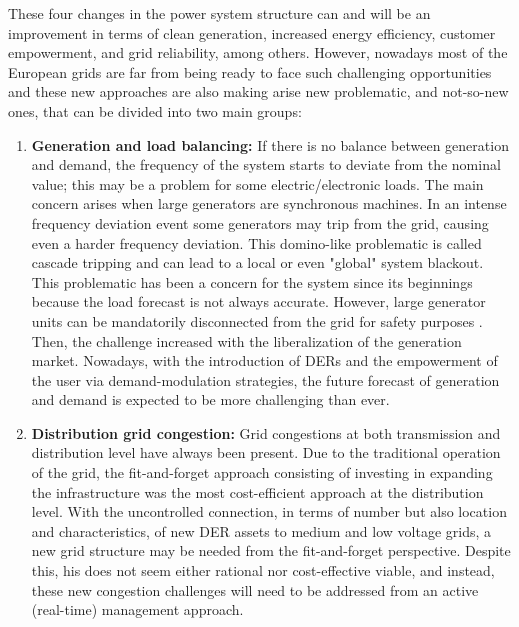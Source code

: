 These four changes in the power system structure can and will be an improvement in terms of clean generation, increased energy efficiency, customer empowerment, and grid reliability, among others. However,  nowadays most of the European grids are far from being ready to face such challenging opportunities and these new approaches are also making arise new problematic, and not-so-new ones, that can be divided into two main groups: 
\begin{enumerate}
\item \textbf{Generation and load balancing:} If there is no balance between generation and demand, the frequency of the system starts to deviate from the nominal value; this may be a problem for some electric/electronic loads. The main concern arises when large generators are synchronous machines. In an intense frequency deviation event some generators may trip from the grid, causing even a harder frequency deviation. This domino-like problematic is called cascade tripping and can lead to a local or even "global" system blackout. This problematic has been a concern for the system since its beginnings because the load forecast is not always accurate. However, large generator units can be mandatorily disconnected from the grid for safety purposes \cite{Bollen2011}. Then, the challenge increased with the liberalization of the generation market. Nowadays, with the introduction of DERs and the empowerment of the user via demand-modulation strategies, the future forecast of generation and demand is expected to be more challenging than ever.

\item \textbf{Distribution grid congestion:} Grid congestions at both transmission and distribution level have always been present. Due to the traditional operation of the grid, the fit-and-forget approach consisting of investing in expanding the infrastructure was the most cost-efficient approach at the distribution level. With the uncontrolled connection, in terms of number but also location and characteristics, of new DER assets to medium and low voltage grids, a new grid structure may be needed from the fit-and-forget perspective. Despite this, his does not seem either rational nor cost-effective viable, and instead, these new congestion challenges will need to be addressed from an active (real-time) management approach.
\end{enumerate}



